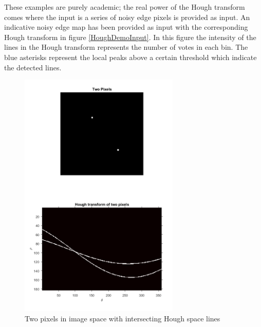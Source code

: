 \documentclass{article}
\begin{document}
	


	
	
	These examples are purely academic; the real power of the Hough transform comes where the input is a series of noisy edge pixels is provided as input. An indicative noisy edge map has been provided as input with the corresponding Hough transform in figure \ref{HoughDemoInput}. In this figure the intensity of the lines in the Hough transform represents the number of votes in each bin. The blue asterisks represent the local peaks above a certain threshold which indicate the detected lines.
	
	\begin{figure}
		\centering
		\includegraphics[width=3.0in]{HoughBasics2}
		\caption{Two pixels in image space with intersecting Hough space lines}
		\label{HoughBasics2}
	\end{figure}
	
\end{document}
